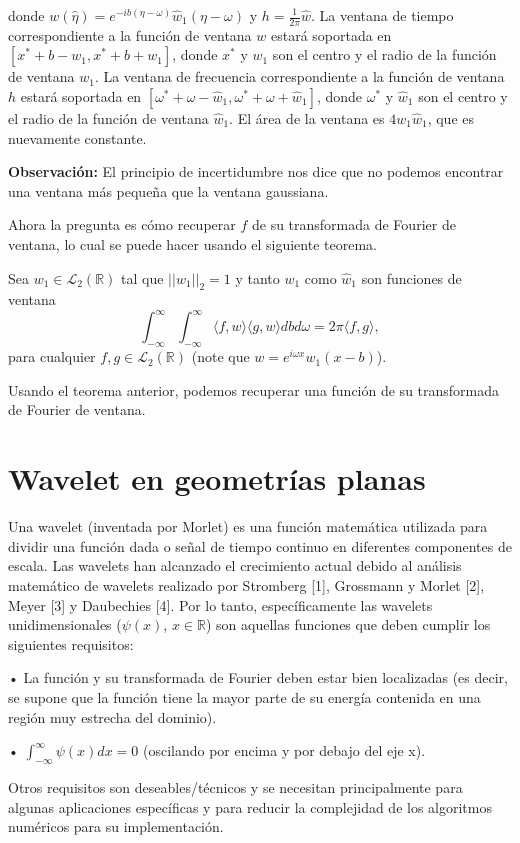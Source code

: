 \begin{multicols}{2}
donde $w(\hat{\eta}) = e^{-ib(\eta-\omega)} \hat{w}_1(\eta - \omega)$ y $h = \frac{1}{2\pi}\hat{w}$. La ventana de tiempo correspondiente a la función de ventana $w$ estará soportada en $[x^* + b - w_1 , x^* + b + w_1]$, donde $x^*$ y $w_1$ son el centro y el radio de la función de ventana $w_1$. La ventana de frecuencia correspondiente a la función de ventana $h$ estará soportada en $[\omega^* + \omega - \hat{w}_1 , \omega^* + \omega + \hat{w}_1]$, donde $\omega^*$ y $\hat{w}_1$ son el centro y el radio de la función de ventana $\hat{w}_1$. El área de la ventana es $4w_1\hat{w}_1$, que es nuevamente constante.

\textbf{Observación:}\; El principio de incertidumbre nos dice que no podemos encontrar una ventana más pequeña que la ventana gaussiana.

Ahora la pregunta es cómo recuperar $f$ de su transformada de Fourier de ventana, lo cual se puede hacer usando el siguiente teorema.

\begin{teorema}
    Sea $w_1 \in \mathcal{L}_2(\mathbb{R})$ tal que $||w_1||_2 = 1$ y tanto $w_1$ como $\hat{w}_1$ son funciones de ventana
    $$\int_{-\infty}^{\infty} \int_{-\infty}^{\infty} \langle f,w \rangle \langle g,w \rangle db d\omega = 2\pi \langle f, g \rangle,$$
    para cualquier $f, g \in \mathcal{L}_2(\mathbb{R})$ (note que $w = e^{i\omega x}w_1(x - b)$).
\end{teorema}

Usando el teorema anterior, podemos recuperar una función de su transformada de Fourier de ventana.



\chapter{Wavelet en geometrías planas}

Una wavelet (inventada por Morlet) es una función matemática utilizada para dividir una función dada o señal de tiempo continuo en diferentes componentes de escala. Las wavelets han alcanzado el crecimiento actual debido al análisis matemático de wavelets realizado por Stromberg [1], Grossmann y Morlet [2], Meyer [3] y Daubechies [4]. Por lo tanto, específicamente las wavelets unidimensionales ($\psi(x)$, $x \in \mathbb{R}$) son aquellas funciones que deben cumplir los siguientes requisitos:

• La función y su transformada de Fourier deben estar bien localizadas (es decir, se supone que la función tiene la mayor parte de su energía contenida en una región muy estrecha del dominio).

• $\int_{-\infty}^{\infty} \psi(x) dx = 0$ (oscilando por encima y por debajo del eje x).

Otros requisitos son deseables/técnicos y se necesitan principalmente para algunas aplicaciones específicas y para reducir la complejidad de los algoritmos numéricos para su implementación.



\end{multicols}
